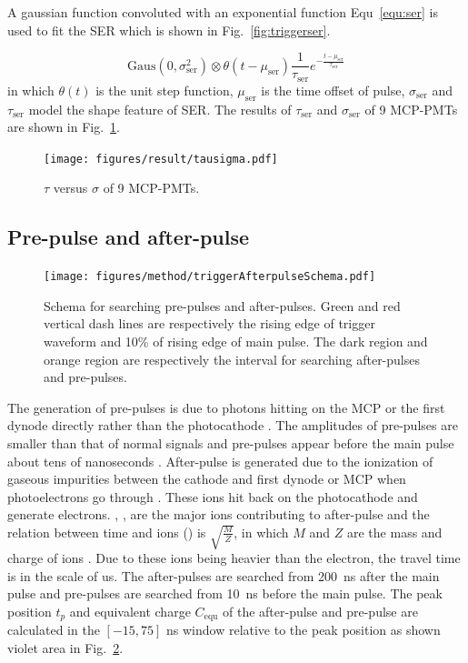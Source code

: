 A gaussian function convoluted with an exponential function Equ~\eqref{equ:ser} is used to fit the SER which is shown in Fig.~\ref{fig:triggerser}.

\begin{equation}
    \label{equ:ser}
    \mathrm{Gaus}(0,\sigma_{\mathrm{ser}}^2)\otimes\theta(t-\mu_{\mathrm{ser}})\frac{1}{\tau_{\mathrm{ser}}}e^{-\frac{t-\mu_{\mathrm{ser}}}{\tau_{\mathrm{ser}}}}
\end{equation}
in which $\theta(t)$ is the unit step function, $\mu_{\mathrm{ser}}$ is the time offset of pulse, $\sigma_{\mathrm{ser}}$ and $\tau_{\mathrm{ser}}$ model the shape feature of SER. The results of $\tau_{\mathrm{ser}}$ and $\sigma_{\mathrm{ser}}$ of 9 MCP-PMTs are shown in Fig.~\ref{fig:sigmaCompare}.
\begin{figure}[!htbp]
    \centering
    \texttt{[image: figures/result/tausigma.pdf]}
    \caption{$\tau$ versus $\sigma$ of 9 MCP-PMTs.}
    \label{fig:sigmaCompare}
\end{figure}


\subsection{Pre-pulse and after-pulse}

\begin{figure}
    \centering
    \texttt{[image: figures/method/triggerAfterpulseSchema.pdf]}
    \caption{Schema for searching pre-pulses and after-pulses. Green and red vertical dash lines are respectively the rising edge of trigger waveform and 10\% of rising edge of main pulse. The dark region and orange region are respectively the interval for searching after-pulses and pre-pulses.}
    \label{fig:afterpulseSchema}
\end{figure}

The generation of pre-pulses is due to photons hitting on the MCP or the first dynode directly rather than the photocathode \cite{JUNOMassTesting}. The amplitudes of pre-pulses are smaller than that of normal signals and pre-pulses appear before the main pulse about tens of nanoseconds \cite{JUNOMassTesting}. After-pulse is generated due to the ionization of gaseous impurities between the cathode and first dynode or MCP when photoelectrons go through \cite{Coates_1973}. These ions hit back on the photocathode and generate electrons. , ,  are the major ions contributing to after-pulse and the relation between time and ions () is $\sqrt{\frac{M}{Z}}$, in which $M$ and $Z$ are the mass and charge of ions \cite{Coates_1973,XENON1TTesting}. Due to these ions being heavier than the electron, the travel time is in the scale of \si{us}. The after-pulses are searched from \SI{200}{ns} after the main pulse and pre-pulses are searched from \SI{10}{ns} before the main pulse. The peak position $t_p$ and equivalent charge $C_{\mathrm{equ}}$ of the after-pulse and pre-pulse are calculated in the $[-15,75]$ ns window relative to the peak position as shown violet area in Fig.~\ref{fig:afterpulseSchema}.

